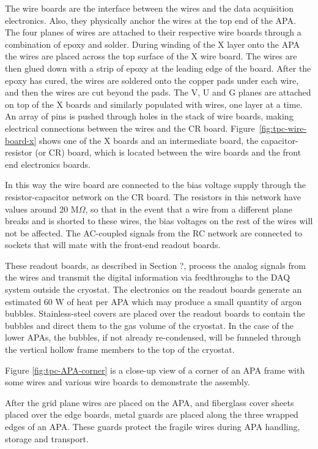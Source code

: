 The wire boards are the interface between the wires and the data acquisition electronics.  Also, they physically anchor the wires at the top end of the APA.  The four planes of wires are attached to their respective wire boards through a combination of epoxy and solder. During winding of the X layer onto the APA the wires are placed across the top surface of the X wire board. The wires are then glued down with a strip of epoxy at the leading edge of the board.  After the epoxy has cured, the wires are soldered onto the copper pads under each wire, and then the wires are cut beyond the pads. The V, U and G planes are attached on top of the X boards and similarly populated with wires, one layer at a time. An array of pins is pushed through holes in the stack of wire boards, making electrical connections between the wires and the CR board.   
Figure~\ref{fig:tpc-wire-board-x} shows one of the X boards and an intermediate board, the capacitor-resistor (or CR) board, which is located between the wire boards and the front end electronics boards.  

In this way the wire board are connected to the bias voltage supply through the resistor-capacitor network on the CR board. The resistors in this network have values around 20 M$\Omega$, so that in the event that a wire from a different plane breaks and is shorted to these wires, the bias voltages on the rest of the wires will not be affected. The AC-coupled signals from the RC network are connected to sockets that will mate with the front-end readout boards.

These readout boards, as described in Section ?, process the analog signals from the wires and transmit the digital information via feedthroughs to the DAQ system outside the cryostat. The electronics on the readout boards generate an estimated 60 W of heat per APA which may produce a small quantity of argon bubbles.  Stainless-steel covers are placed over the readout boards to contain the bubbles and direct them to the gas volume of the cryostat. In the case of the lower APAs, the bubbles, if not already re-condensed, will be funneled through the vertical hollow frame members to the top of the cryostat.


Figure \ref{fig:tpc-APA-corner} is a close-up view of a corner of an APA frame with some wires and various wire boards to demonstrate the assembly.

After the grid plane wires are placed on the APA, and fiberglass cover sheets placed over the edge boards, metal guards are placed along the three wrapped edges of an APA. These guards protect the fragile wires during APA handling, storage and transport.



